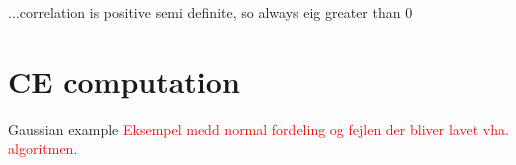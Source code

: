 \documentclass[../Thesis.tex]{subfiles}
\begin{document}
...correlation is positive semi definite, so always eig greater than 0








\section{CE computation}\label{sec:gaussian MI error}
Gaussian example
\textcolor{red}{Eksempel medd normal fordeling og fejlen der bliver lavet vha. algoritmen.}
\end{document}
